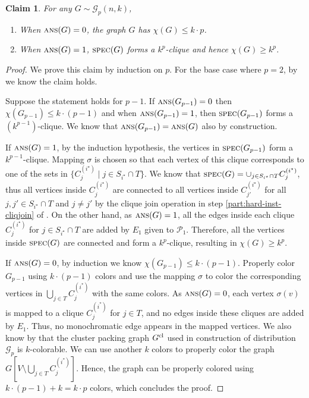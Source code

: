 \documentclass[11pt]{article}
\newtheorem{claim}[lemma]{Claim}
\theoremstyle{definition}
\renewcommand{\leq}{\leqslant}
\renewcommand{\geq}{\geqslant}
\newcommand{\chrom}{\ensuremath{\chi}}
\newcommand{\player}[1]{\ensuremath{\mathcal{P}_{#1}}}
\newcommand{\cG}{\ensuremath{\mathcal{G}}}
\newcommand{\cliqnum}[2]{\ensuremath{C^{(#1)}_{#2}}}
\newcommand{\ans}{\ensuremath{\textnormal{\textsc{ans}}}}
\newcommand{\spec}{\ensuremath{\textnormal{\textsc{spec}}}}
\newcommand{\istar}{\ensuremath{i^{\star}}}
\begin{document}
	\begin{claim}\label{clm:ans-to-chromatic}
		For any $G \sim \cG_p(n,k)$, 
		\begin{enumerate}[label=$(\roman*)$]
			\item When $\ans(G) = 0$, the graph $G$ has $\chrom(G) \leq  k\cdot p$. 
			\item When $\ans(G) = 1$, $\spec(G)$ forms a $k^{p}$-clique and hence $\chrom(G) \geq k^{p}$.  
		\end{enumerate}
	\end{claim}
	\begin{proof}
		We prove this claim by induction on $p$.
		For the base case where $p=2$, by~ we know the claim holds.
		
		Suppose the statement holds for $p-1$. If $\ans(G_{p-1})=0$ then $\chrom(G_{p-1})\leq k\cdot (p-1)$ and when $\ans(G_{p-1}) = 1$, then $\spec(G_{p-1})$ forms a  $(k^{p-1})$-clique. We know that $\ans(G_{p-1}) = \ans(G)$ also by construction.

		If $\ans(G)=1$, by the induction hypothesis, the vertices in $\spec(G_{p-1})$ form a $k^{p-1}$-clique.  Mapping $\sigma$ is chosen so that each vertex of this clique corresponds to one of the sets in $\{\cliqnum{\istar}{j} \mid j \in S_{\istar} \cap T\}$. We know that $\spec(G) = \cup_{j \in S_{\istar} \cap T} \cliqnum{\istar}{j}$, thus all vertices inside $\cliqnum{\istar}{j}$ are connected to all vertices inside $\cliqnum{\istar}{j'}$ for all $j, j' \in S_{\istar} \cap T$ and $j \neq j'$ by the clique join operation in step \ref{part:hard-inst-cliqjoin} of . On the other hand, as $\ans(G)=1$, all the edges inside each clique $\cliqnum{\istar}{j}$ for $j \in S_{\istar} \cap T$ are added by $E_1$ given to $\player{1}$. Therefore, all the vertices inside $\spec(G)$ are connected and form a $k^p$-clique, resulting in $\chi(G)\geq k^p$. 


 		If $\ans(G)=0$, by induction we know $\chi(G_{p-1})\leq k\cdot (p-1)$. Properly color $G_{p-1}$ using $k\cdot (p-1)$ colors and use the mapping $\sigma$ to color the corresponding vertices in $\bigcup_{j\in T} C_j^{(i^*)}$ with the same colors. As $\ans(G)=0$, each vertex $\sigma(v)$ is mapped to a clique $\cliqnum{i^*}{j}$ for $j \in T$, and no edges inside these cliques are added by $E_1$. Thus, no monochromatic edge appears in the mapped vertices.  We also know by  that the cluster packing graph $G^{\textnormal{cl}}$ used in construction of distribution $\cG_p$ is $k$-colorable. We can use another $k$ colors to properly color the graph $G[V \setminus \bigcup_{j\in T} C_j^{(i^*)}]$. Hence, the graph can be properly colored using $k\cdot (p-1)+k=k\cdot p$ colors, which concludes the proof.
	\end{proof}
\end{document}
